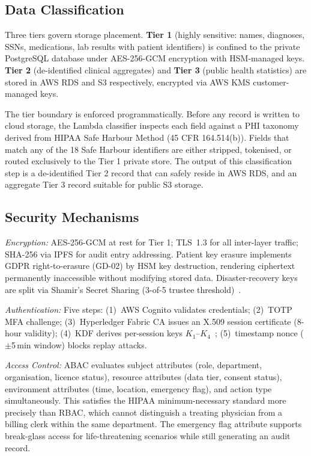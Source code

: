 \documentclass[10pt,twocolumn,a4paper]{article}
\begin{document}
\subsection{Data Classification}

Three tiers govern storage placement. \textbf{Tier 1} (highly sensitive:
names, diagnoses, SSNs, medications, lab results with patient
identifiers) is confined to the private PostgreSQL database under
AES-256-GCM encryption with HSM-managed keys. \textbf{Tier 2}
(de-identified clinical aggregates) and \textbf{Tier 3} (public health
statistics) are stored in AWS RDS and S3 respectively, encrypted via
AWS KMS customer-managed keys.

The tier boundary is enforced programmatically. Before any record is
written to cloud storage, the Lambda classifier inspects each field
against a PHI taxonomy derived from HIPAA Safe Harbour Method (45 CFR
164.514(b)). Fields that match any of the 18 Safe Harbour identifiers
are either stripped, tokenised, or routed exclusively to the Tier 1
private store. The output of this classification step is a de-identified
Tier 2 record that can safely reside in AWS RDS, and an aggregate Tier 3
record suitable for public S3 storage.

\subsection{Security Mechanisms}

\textit{Encryption:} AES-256-GCM at rest for Tier 1; TLS~1.3 for all
inter-layer traffic; SHA-256 via IPFS for audit entry addressing.
Patient key erasure implements GDPR right-to-erasure (GD-02) by HSM
key destruction, rendering ciphertext permanently inaccessible without
modifying stored data. Disaster-recovery keys are split via Shamir's
Secret Sharing (3-of-5 trustee threshold)~\cite{barbaria2025}.

\textit{Authentication:} Five steps: (1)~AWS Cognito validates
credentials; (2)~TOTP MFA challenge; (3)~Hyperledger Fabric CA issues
an X.509 session certificate (8-hour validity); (4)~KDF derives
per-session keys $K_1$--$K_4$~\cite{masud2021}; (5)~timestamp nonce
($\pm$5\,min window) blocks replay attacks.

\textit{Access Control:} ABAC evaluates subject attributes (role,
department, organisation, licence status), resource attributes (data
tier, consent status), environment attributes (time, location, emergency
flag), and action type simultaneously. This satisfies the HIPAA
minimum-necessary standard more precisely than RBAC, which cannot
distinguish a treating physician from a billing clerk within the same
department. The emergency flag attribute supports break-glass access
for life-threatening scenarios while still generating an audit record.
\end{document}
